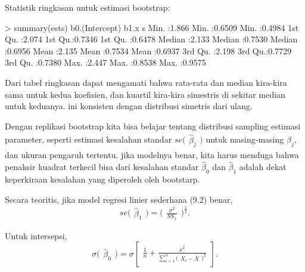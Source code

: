\documentclass[a4paper,12pt]{article}
\theoremstyle{definition}
\begin{document}
Statistik ringkasan untuk estimasi bootstrap:

\begin{spverbatim}
> summary(ests)
b0.(Intercept)      b1.x                s
Min.    :1.866  Min.   :0.6509  Min.    :0.4984
1st Qu. :2.074  1st Qu.:0.7346  1st Qu. :0.6478
Median  :2.133  Median :0.7530  Median  :0.6956
Mean    :2.135  Mean   :0.7534  Mean    :0.6937
3rd Qu. :2.198  3rd Qu.:0.7729  3rd Qu. :0.7380
Max.    :2.447  Max.   :0.8538  Max.    :0.9575
\end{spverbatim}

Dari tabel ringkasan dapat mengamati bahwa rata-rata dan median kira-kira sama untuk kedua koefisien, dan kuartil kira-kira simestris di sekitar median untuk keduanya. ini konsisten dengan distribusi simetris dari ulang.

Dengan replikasi bootstrap kita bisa belajar tentang distribusi sampling estimasi parameter, seperti estimasi kesalahan standar $se \bigl(\begin{smallmatrix}
\widehat{\beta}_{j}
\end{smallmatrix}\bigr)$ untuk masing-masing $\beta _{j}$, dan ukuran pengaruh tertentu. jika modelnya benar, kita harus menduga bahwa penaksir kuadrat terkecil bisa dari kesalahan standar $\widehat{\beta }_{0}$ dan $\widehat{\beta }_{1}$ adalah dekat keperkiraan kesalahan yang diperoleh oleh bootstarp.

Secara teoritis, jika model regresi linier sederhana (9.2) benar,
\begin{equation*}
    se \bigl(\begin{smallmatrix}
\widehat{\beta }_{1}
\end{smallmatrix}\bigr) = \bigl(\begin{smallmatrix}
\frac{\sigma ^{2}}{SS_{x}}
\end{smallmatrix}\bigr)^{\frac{1}{2}}.
\end{equation*}

Untuk intersepsi,
\begin{equation*}
    \sigma \bigl(\begin{smallmatrix}
\widehat{\beta }_{0}
\end{smallmatrix}\bigr) = \sigma \begin{bmatrix}
\frac{1}{n}+ \frac{\bar{x}^{2}}{\sum_{i=1}^{n}\bigl(\begin{smallmatrix}
X_{i}-\bar{X}
\end{smallmatrix}\bigr)^{2}}
\end{bmatrix}.
\end{equation*}
\end{document}
